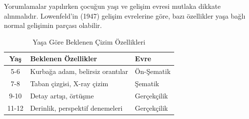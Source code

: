 \begin{warningbox}
Yorumlamalar yapılırken çocuğun yaşı ve gelişim evresi mutlaka dikkate alınmalıdır. Lowenfeld'in (1947) gelişim evrelerine göre, bazı özellikler yaşa bağlı normal gelişimin parçası olabilir.
\end{warningbox}

\begin{table}[H]
\centering
\caption{Yaşa Göre Beklenen Çizim Özellikleri}
\label{tab:yas}
\begin{tabular}{cll}
\toprule
\textbf{Yaş} & \textbf{Beklenen Özellikler} & \textbf{Evre} \\
\midrule
5-6 & Kurbağa adam, belirsiz orantılar & Ön-Şematik \\
7-8 & Taban çizgisi, X-ray çizim & Şematik \\
9-10 & Detay artışı, örtüşme & Gerçekçilik \\
11-12 & Derinlik, perspektif denemeleri & Gerçekçilik \\
\bottomrule
\end{tabular}
\end{table}

\newpage

